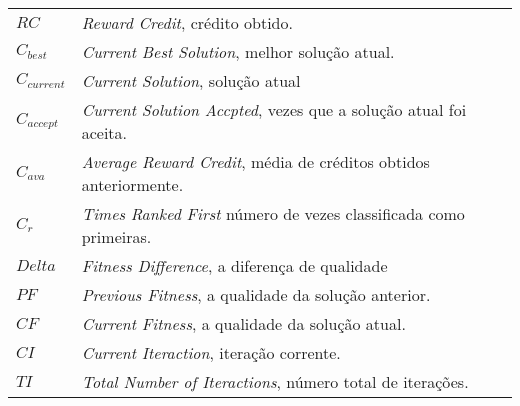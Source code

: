 

\begin{listasimb}

\begin{longtable}{ll}
$RC$ & \textit{Reward Credit}, crédito obtido.\\
$C_{best}$ & \textit{Current Best Solution}, melhor solução atual.\\
$C_{current}$ & \textit{Current Solution}, solução atual\\
$C_{accept}$ & \textit{Current Solution Accpted}, vezes que a solução atual foi aceita.\\
$C_{ava}$ & \textit{Average Reward Credit}, média de créditos obtidos anteriormente. \\
$C_r$ & \textit{Times Ranked First} número de vezes classificada como primeiras.\\

$Delta$ & \textit{Fitness Difference}, a diferença de qualidade\\
 $PF$ & \textit{Previous Fitness}, a qualidade da solução anterior.\\
 $CF$ & \textit{Current Fitness}, a qualidade da solução atual.\\
 
 $CI$ & \textit{Current Iteraction}, iteração corrente.\\
 $TI$ & \textit{Total Number of Iteractions}, número total de iterações.

\end{longtable}

\end{listasimb}

